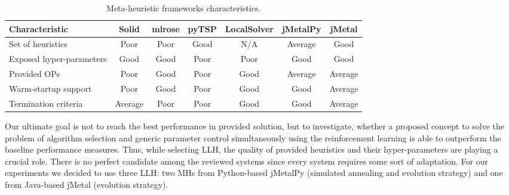 \begin{table}[h!]
	\centering
	\begin{tabular}{l||cccccc}
		\textbf{Characteristic} & \textbf{Solid} & \textbf{mlrose} & \textbf{pyTSP} & \textbf{LocalSolver} & \textbf{jMetalPy} & \textbf{jMetal} \\
		\hline
		\hline
		Set of heuristics & \cellcolor{red!25}Poor & \cellcolor{red!25}Poor & \cellcolor{green!25}Good & N/A & \cellcolor{yellow!25}Average & \cellcolor{green!25}Good \\
		
		Exposed hyper-parameters & \cellcolor{green!25}Good & \cellcolor{green!25}Good & \cellcolor{red!25}Poor & \cellcolor{red!25}Poor & \cellcolor{green!25}Good & \cellcolor{green!25}Good \\
		
		Provided OPs & \cellcolor{red!25}Poor & \cellcolor{green!25}Good & \cellcolor{red!25}Poor & \cellcolor{green!25}Good & \cellcolor{yellow!25}Average & \cellcolor{yellow!25}Average \\
		
		Warm-startup support & \cellcolor{red!25}Poor & \cellcolor{green!25}Good & \cellcolor{red!25}Poor & \cellcolor{green!25}Good & \cellcolor{green!25}Good & \cellcolor{yellow!25}Average \\
		
		Termination criteria & \cellcolor{yellow!25}Average & \cellcolor{red!25}Poor & \cellcolor{red!25}Poor & \cellcolor{green!25}Good & \cellcolor{green!25}Good & \cellcolor{yellow!25}Average \\
	\end{tabular}
	\caption{Meta-heuristic frameworks characteristics.}
	\label{iml: table llh selection}
\end{table}

Our ultimate goal is not to reach the best performance in provided solution, but to investigate, whether a proposed concept to solve the problem of algorithm selection and generic parameter control simultaneously using the reinforcement learning is able to outperform the baseline performance measures. Thus, while selecting LLH, the quality of provided heuristics and their hyper-parameters are playing a crucial role. There is no perfect candidate among the reviewed systems since every system requires some sort of adaptation. For our experiments we decided to use three LLH: two MHs from Python-based jMetalPy (simulated annealing and evolution strategy) and one from Java-based jMetal (evolution strategy).


